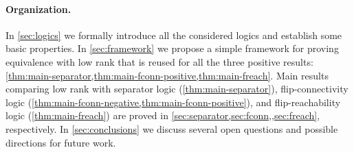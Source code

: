 \paragraph*{Organization.} In \cref{sec:logics} we formally introduce all the considered logics and establish some basic properties. In \cref{sec:framework} we propose a simple framework for proving equivalence with low rank \mso that is reused for all the three positive results: \cref{thm:main-separator,thm:main-fconn-positive,thm:main-freach}. Main results comparing low rank \mso with separator logic (\cref{thm:main-separator}), flip-connectivity logic (\cref{thm:main-fconn-negative,thm:main-fconn-positive}), and flip-reachability logic (\cref{thm:main-freach}) are proved in \cref{sec:separator,sec:fconn,,sec:freach}, respectively. In \cref{sec:conclusions} we discuss several open questions and possible directions for future work.
